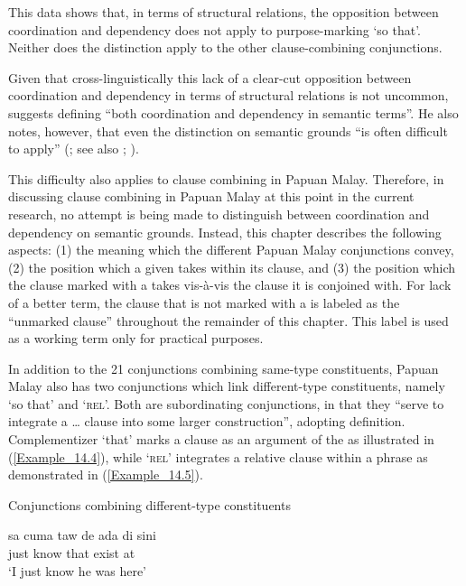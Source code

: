 \noindent This data shows that, in terms of structural relations, the opposition between coordination and dependency does not apply to purpose-marking  ‘so that’. Neither does the distinction apply to the other clause-combining conjunctions.



Given that cross-linguistically this lack of a clear-cut opposition between coordination and dependency in terms of structural relations is not uncommon, \citet[46]{Haspelmath.2007c} suggests defining ``both coordination and dependency in semantic terms''. He also notes, however, that even the distinction on semantic grounds “is often difficult to apply” (\citeyear*[47]{Haspelmath.2007c}; see also \citealt[1–50]{Cristofaro.2005}; \citealt{Dixon.2009}).
%


This difficulty also applies to clause combining in Papuan Malay. Therefore, in discussing clause combining in Papuan Malay at this point in the current research, no attempt is being made to distinguish between coordination and dependency on semantic grounds. Instead, this chapter describes the following aspects: (1) the meaning which the different Papuan Malay conjunctions convey, (2) the position which a given  takes within its clause, and (3) the position which the clause marked with a  takes vis-à-vis the clause it is conjoined with. For lack of a better term, the clause that is not marked with a  is labeled as the ``unmarked clause'' throughout the remainder of this chapter. This label is used as a working term only for practical purposes.
%


In addition to the 21 conjunctions combining same-type constituents, Papuan Malay also has two conjunctions which link different-type constituents, namely   ‘so that’ and   ‘\textsc{rel}’. Both are subordinating conjunctions, in that they “serve to integrate a {\ldots} clause into some larger construction”, adopting   definition. Complementizer  ‘that’ marks a clause as an argument of the  as illustrated in (\ref{Example_14.4}), while   ‘\textsc{rel}’ integrates a relative clause within a  phrase as demonstrated in (\ref{Example_14.5}).
%

\begin{styleExampleTitle}
Conjunctions combining different-type constituents
\end{styleExampleTitle}
\ea
\label{Example_14.4}
\gll  sa cuma taw  de ada di sini\\  
  just know that  exist at \\
\glt ‘I just know  he was here’ \textstyleExampleSource{[080922-010a-CvNF.0180]}
\z

